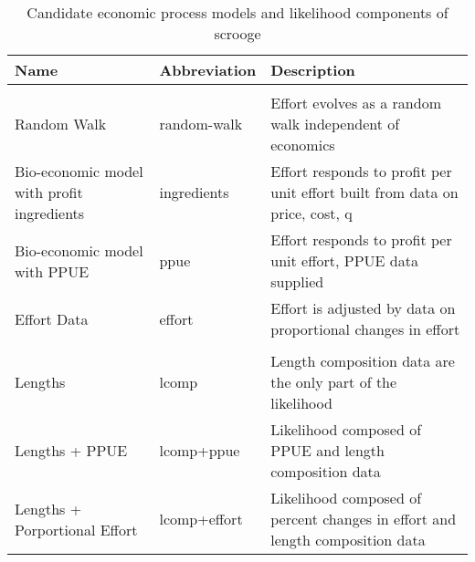 \documentclass[twoside,12pt,final]{ucthesis-CA2012}
\begin{document}
\begin{ucmainmatter}
\begin{table}
\caption{\label{tab:model-table}Candidate economic process models and likelihood components of scrooge}
\centering
\fontsize{9}{11}\selectfont
\begin{tabu} to 
\toprule
\textbf{Name} & \textbf{Abbreviation} & \textbf{Description}\\
\midrule
\addlinespace[0.3em]
\\
\hspace{1em}Random Walk & random-walk & Effort evolves as a random walk independent of economics\\
\hspace{1em}Bio-economic model with profit ingredients & ingredients & Effort responds to profit per unit effort built from data on price, cost, q\\
\hspace{1em}Bio-economic model with PPUE & ppue & Effort responds to profit per unit effort, PPUE data supplied\\
\hspace{1em}Effort Data & effort & Effort is adjusted by data on proportional changes in effort\\
\addlinespace[0.3em]
\\
\hspace{1em}Lengths & lcomp & Length composition data are the only part of the likelihood\\
\hspace{1em}Lengths + PPUE & lcomp+ppue & Likelihood composed of PPUE and length composition data\\
\hspace{1em}Lengths + Porportional Effort & lcomp+effort & Likelihood composed of percent changes in effort and length composition data\\
\bottomrule
\end{tabu}
\end{table}
\begin{table}


\end{table}
\end{ucmainmatter}
\end{document}
